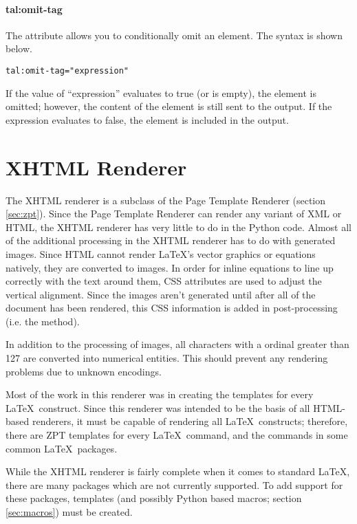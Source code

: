 \paragraph{tal:omit-tag}

The  attribute allows you to conditionally omit an
element.  The syntax is shown below.
\begin{verbatim}
tal:omit-tag="expression"
\end{verbatim}

If the value of ``expression'' evaluates to true (or is empty), the element 
is omitted; however, the content of the element is still sent to the output.
If the expression evaluates to false, the element is included in the 
output.


\section{XHTML Renderer}

The XHTML renderer is a subclass of the Page Template Renderer (section
\ref{sec:zpt}).  Since the Page Template Renderer can render any variant
of XML or HTML, the XHTML renderer has very little to do in the Python
code.  Almost all of the additional processing in the XHTML renderer has
to do with generated images.  Since HTML cannot render \LaTeX's vector
graphics or equations natively, they are converted to images.  In order
for inline equations to line up correctly with the text around them, CSS
attributes are used to adjust the vertical alignment.  Since the images
aren't generated until after all of the document has been rendered, this
CSS information is added in post-processing (i.e. the 
method).

In addition to the processing of images, all characters with a ordinal
greater than 127 are converted into numerical entities.  This should 
prevent any rendering problems due to unknown encodings.

Most of the work in this renderer was in creating the templates for 
every \LaTeX\ construct.  Since this renderer was intended to be the
basis of all HTML-based renderers, it must be capable of rendering
all \LaTeX\ constructs; therefore, there are ZPT templates for every
\LaTeX\ command, and the commands in some common \LaTeX\ packages.

While the XHTML renderer is fairly complete when it comes to standard
\LaTeX, there are many packages which are not currently supported.
To add support for these packages, templates (and possibly Python
based macros; section \ref{sec:macros}) must be created.


